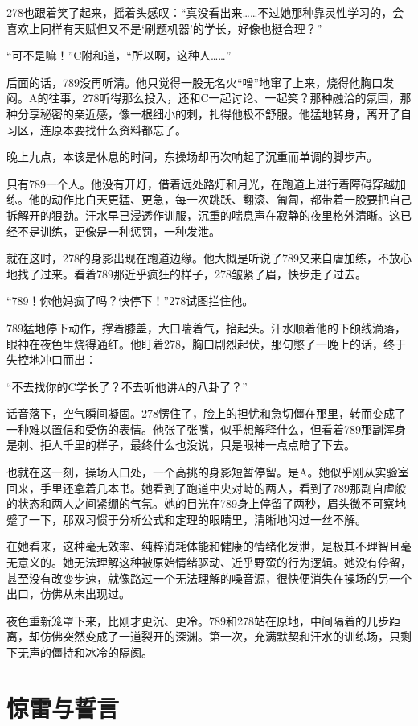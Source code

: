 \documentclass[a4paper]{book}
\begin{document}
278也跟着笑了起来，摇着头感叹：“真没看出来……不过她那种靠灵性学习的，会喜欢上同样有天赋但又不是‘刷题机器’的学长，好像也挺合理？”

“可不是嘛！”C附和道，“所以啊，这种人……”

后面的话，789没再听清。他只觉得一股无名火“噌”地窜了上来，烧得他胸口发闷。A的往事，278听得那么投入，还和C一起讨论、一起笑？那种融洽的氛围，那种分享秘密的亲近感，像一根细小的刺，扎得他极不舒服。他猛地转身，离开了自习区，连原本要找什么资料都忘了。

晚上九点，本该是休息的时间，东操场却再次响起了沉重而单调的脚步声。

只有789一个人。他没有开灯，借着远处路灯和月光，在跑道上进行着障碍穿越加练。他的动作比白天更猛、更急，每一次跳跃、翻滚、匍匐，都带着一股要把自己拆解开的狠劲。汗水早已浸透作训服，沉重的喘息声在寂静的夜里格外清晰。这已经不是训练，更像是一种惩罚，一种发泄。

就在这时，278的身影出现在跑道边缘。他大概是听说了789又来自虐加练，不放心地找了过来。看着789那近乎疯狂的样子，278皱紧了眉，快步走了过去。

“789！你他妈疯了吗？快停下！”278试图拦住他。

789猛地停下动作，撑着膝盖，大口喘着气，抬起头。汗水顺着他的下颌线滴落，眼神在夜色里烧得通红。他盯着278，胸口剧烈起伏，那句憋了一晚上的话，终于失控地冲口而出：

“不去找你的C学长了？不去听他讲A的八卦了？”

话音落下，空气瞬间凝固。278愣住了，脸上的担忧和急切僵在那里，转而变成了一种难以置信和受伤的表情。他张了张嘴，似乎想解释什么，但看着789那副浑身是刺、拒人千里的样子，最终什么也没说，只是眼神一点点暗了下去。

也就在这一刻，操场入口处，一个高挑的身影短暂停留。是A。她似乎刚从实验室回来，手里还拿着几本书。她看到了跑道中央对峙的两人，看到了789那副自虐般的状态和两人之间紧绷的气氛。她的目光在789身上停留了两秒，眉头微不可察地蹙了一下，那双习惯于分析公式和定理的眼睛里，清晰地闪过一丝不解。

在她看来，这种毫无效率、纯粹消耗体能和健康的情绪化发泄，是极其不理智且毫无意义的。她无法理解这种被原始情绪驱动、近乎野蛮的行为逻辑。她没有停留，甚至没有改变步速，就像路过一个无法理解的噪音源，很快便消失在操场的另一个出口，仿佛从未出现过。

夜色重新笼罩下来，比刚才更沉、更冷。789和278站在原地，中间隔着的几步距离，却仿佛突然变成了一道裂开的深渊。第一次，充满默契和汗水的训练场，只剩下无声的僵持和冰冷的隔阂。

\newpage
\large
\chapter{惊雷与誓言}
\normalsize
\end{document}
